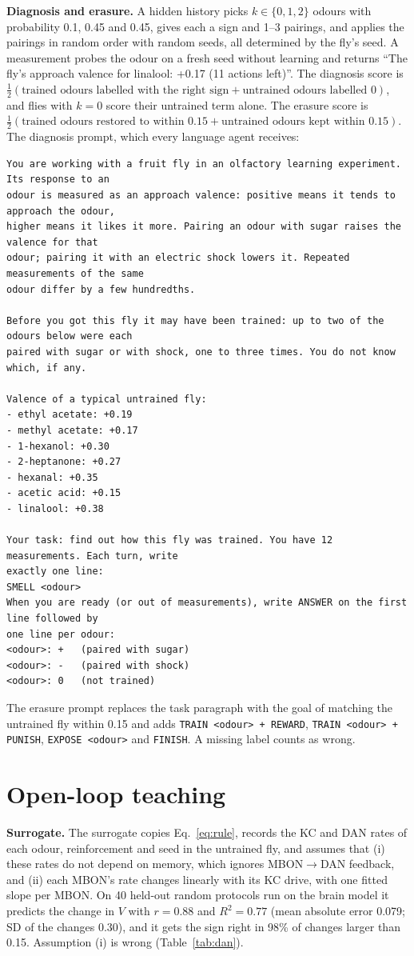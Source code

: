 \textbf{Diagnosis and erasure.} A hidden history picks $k\in\{0,1,2\}$ odours with probability 0.1, 0.45 and 0.45, gives each a sign and 1--3 pairings, and applies the pairings in random order with random seeds, all determined by the fly's seed. A measurement probes the odour on a fresh seed without learning and returns ``The fly's approach valence for linalool: +0.17 (11 actions left)''. The diagnosis score is $\frac12(\text{trained odours labelled with the right sign}+\text{untrained odours labelled }0)$, and flies with $k=0$ score their untrained term alone. The erasure score is $\frac12(\text{trained odours restored to within }0.15+\text{untrained odours kept within }0.15)$. The diagnosis prompt, which every language agent receives:
{\scriptsize
\begin{verbatim}
You are working with a fruit fly in an olfactory learning experiment. Its response to an
odour is measured as an approach valence: positive means it tends to approach the odour,
higher means it likes it more. Pairing an odour with sugar raises the valence for that
odour; pairing it with an electric shock lowers it. Repeated measurements of the same
odour differ by a few hundredths.

Before you got this fly it may have been trained: up to two of the odours below were each
paired with sugar or with shock, one to three times. You do not know which, if any.

Valence of a typical untrained fly:
- ethyl acetate: +0.19
- methyl acetate: +0.17
- 1-hexanol: +0.30
- 2-heptanone: +0.27
- hexanal: +0.35
- acetic acid: +0.15
- linalool: +0.38

Your task: find out how this fly was trained. You have 12 measurements. Each turn, write
exactly one line:
SMELL <odour>
When you are ready (or out of measurements), write ANSWER on the first line followed by
one line per odour:
<odour>: +   (paired with sugar)
<odour>: -   (paired with shock)
<odour>: 0   (not trained)
\end{verbatim}}
The erasure prompt replaces the task paragraph with the goal of matching the untrained fly within 0.15 and adds \texttt{TRAIN <odour> + REWARD}, \texttt{TRAIN <odour> + PUNISH}, \texttt{EXPOSE <odour>} and \texttt{FINISH}. A missing label counts as wrong.

\section{Open-loop teaching}\label{app:teachgrpo}
\textbf{Surrogate.} The surrogate copies Eq.~\ref{eq:rule}, records the KC and DAN rates of each odour, reinforcement and seed in the untrained fly, and assumes that (i) these rates do not depend on memory, which ignores MBON$\rightarrow$DAN feedback, and (ii) each MBON's rate changes linearly with its KC drive, with one fitted slope per MBON. On 40 held-out random protocols run on the brain model it predicts the change in $V$ with $r=0.88$ and $R^2=0.77$ (mean absolute error 0.079; SD of the changes 0.30), and it gets the sign right in 98\% of changes larger than 0.15. Assumption (i) is wrong (Table~\ref{tab:dan}).

